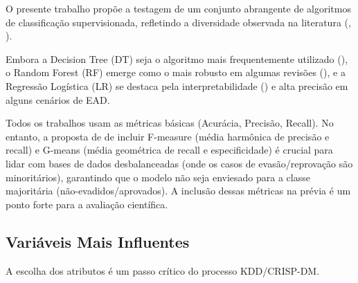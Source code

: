 \documentclass[english, spanish, brazilian]{RBIEarticle} %
\begin{document}
O presente trabalho propõe a testagem de um conjunto abrangente de algoritmos de classificação supervisionada, refletindo a diversidade observada na literatura (\cite{jesus2024mapeamento}, \cite{tamada2025predicting}).

Embora a Decision Tree (DT) seja o algoritmo mais frequentemente utilizado (\cite{jesus2024mapeamento}), o Random Forest (RF) emerge como o mais robusto em algumas revisões (\cite{andradegiron2023predicting}), e a Regressão Logística (LR) se destaca pela interpretabilidade (\cite{ramos2018comparativo}) e alta precisão em alguns cenários de EAD.

Todos os trabalhos usam as métricas básicas (Acurácia, Precisão, Recall). No entanto, a proposta de \cite{neves2024ficare} de incluir F-measure (média harmônica de precisão e recall) e G-means (média geométrica de recall e especificidade) é crucial para lidar com bases de dados desbalanceadas (onde os casos de evasão/reprovação são minoritários), garantindo que o modelo não seja enviesado para a classe majoritária (não-evadidos/aprovados). A inclusão dessas métricas na prévia é um ponto forte para a avaliação científica.


\newpage
\subsection{Variáveis Mais Influentes}

A escolha dos atributos é um passo crítico do processo KDD/CRISP-DM.
\end{document}
